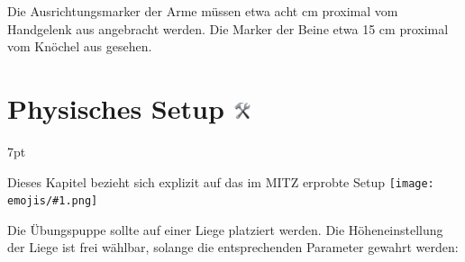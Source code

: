 \documentclass[a4paper, 10pt]{article}
\newcommand{\emoji}[1]{
    \begingroup\normalfont
    \texttt{[image: emojis/\#1.png]}
    \endgroup
}
\newenvironment{tooltip}{%
\small
\vspace*{-4mm}
    \def\FrameCommand{%
    \hspace{1pt}%
    {\color{tooltippipe}\vrule width 0.7mm}%
    {\color{tooltipshade}\vrule width 1.5mm}%
    \colorbox{tooltipshade}%
    }%
    \MakeFramed{\advance\hsize-\width\FrameRestore}%
    \noindent%
    \begin{adjustwidth}{}{7pt}%
    \vspace{2pt}\vspace{2pt}%
}
{%
    \vspace{2pt}\end{adjustwidth}\endMakeFramed%
}
\begin{document}
\noindent Die Ausrichtungsmarker der Arme müssen etwa acht cm proximal vom Handgelenk aus angebracht werden. Die Marker der Beine etwa 15 cm proximal vom Knöchel aus gesehen.

\section{Physisches Setup \includegraphics[height=0.65em]{emojis/hammer-and-wrench.png}}
\label{sec:physical-setup}
\begin{tooltip}
    Dieses Kapitel bezieht sich explizit auf das im MITZ erprobte Setup\emoji{index-pointing-up}
\end{tooltip}
Die Übungspuppe sollte auf einer Liege platziert werden. Die Höheneinstellung der Liege ist frei wählbar, solange die entsprechenden Parameter gewahrt werden:
\end{document}
